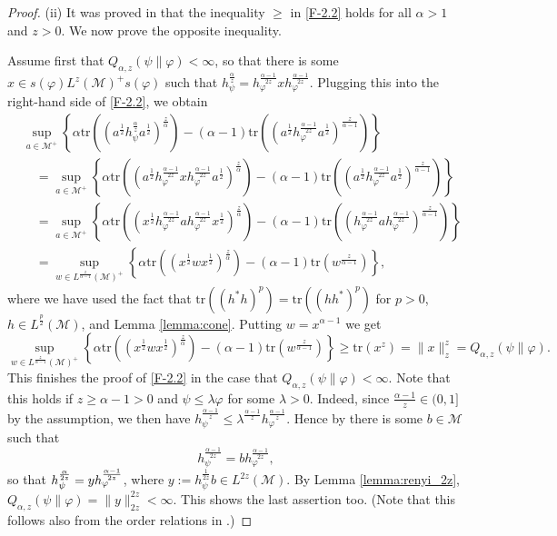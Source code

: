 \documentclass[12pt]{article}
\theoremstyle{definition}
\theoremstyle{remark}
\numberwithin{equation}{section}
\def\Me{\mathcal M}
\def\Tr{\mathrm{tr}}
\def\ffi{\varphi}
\begin{document}
\begin{proof}
\medskip
(ii)\enspace
It was proved in \cite[Theorem 2(vi)]{kato2023onrenyi} that the inequality $\ge$ in
\eqref{F-2.2} holds for all $\alpha>1$ and $z>0$. We now prove the opposite inequality. 

Assume first that $Q_{\alpha,z}(\psi\|\varphi)<\infty$, so that there is some $x\in
s(\varphi)L^z(\Me)^+s(\varphi)$ such that
$h_\psi^{\frac{\alpha}{z}}=h_\varphi^{\frac{\alpha-1}{2z}}xh_\varphi^{\frac{\alpha-1}{2z}}$. Plugging this
into the right-hand side of \eqref{F-2.2}, we obtain
\begin{align}
&\sup_{a\in \Me^+} \left\{\alpha
\Tr\left((a^{\frac12}h_\psi^{\frac{\alpha}{z}}a^{\frac12})^{\frac{z}{\alpha}}\right)-(\alpha-1)
\Tr\left((a^{\frac12}h_\varphi^{\frac{\alpha-1}{2z}}a^{\frac12})^{\frac{z}{\alpha-1}}\right) \right\}
\nonumber\\
&\quad=\sup_{a\in \Me^+} \left\{\alpha
\Tr\left((a^{\frac12}h_\varphi^{\frac{\alpha-1}{2z}}xh_\varphi^{\frac{\alpha-1}{2z}}
a^{\frac12})^{\frac{z}{\alpha}}\right)-(\alpha-1)
\Tr\left((a^{\frac12}h_\varphi^{\frac{\alpha-1}{2z}}a^{\frac12})^{\frac{z}{\alpha-1}}\right) \right\}
\nonumber\\
&\quad=\sup_{a\in \Me^+} \left\{\alpha
\Tr\left((x^{\frac12}h_\varphi^{\frac{\alpha-1}{2z}}ah_\varphi^{\frac{\alpha-1}{2z}}
x^{\frac12})^{\frac{z}{\alpha}}\right)-(\alpha-1)
\Tr\left((h_\varphi^{\frac{\alpha-1}{2z}}a h_\varphi^{\frac{\alpha-1}{2z}}
)^{\frac{z}{\alpha-1}}\right)\right\}\nonumber\\
&\quad=\sup_{w\in L^{\frac{z}{\alpha-1}}(\Me)^+} \left\{\alpha
\Tr\left((x^{\frac12}wx^{\frac12})^{\frac{z}{\alpha}}\right)-(\alpha-1)
\Tr\left(w^{\frac{z}{\alpha-1}}\right)
\right\}, \label{F-2.4}
\end{align}
where we have used the fact that $\Tr\left((h^*h)^p\right)=\Tr\left((hh^*)^p\right)$ for
$p>0$, $h\in L^{\frac{p}{2}}(\Me)$, and Lemma \ref{lemma:cone}.
Putting $w=x^{\alpha-1}$ we get
\[
\sup_{w\in L^{\frac{z}{\alpha-1}}(\Me)^+} \left\{\alpha
\Tr\left((x^{\frac12}wx^{\frac12})^{\frac{z}{\alpha}}\right)-(\alpha-1)
\Tr\left(w^{\frac{z}{\alpha-1}}\right)
\right\}\ge \Tr(x^z)=\|x\|_z^z= Q_{\alpha,z}(\psi\|\varphi).
\]
This finishes the proof of \eqref{F-2.2} in the case that $Q_{\alpha,z}(\psi\|\varphi)<\infty$. Note that
this holds if $z\ge \alpha-1>0$ and $\psi\le \lambda\varphi$ for some $\lambda>0$. Indeed, since
$\frac{\alpha-1}{z}\in (0,1]$ by the assumption, we then have 
$h_\psi^{\frac{\alpha-1}{z}}\le \lambda^{\frac{\alpha-1}{z}}h_\varphi^{\frac{\alpha-1}{z}}$.
Hence by \cite[Lemma A.58]{hiai2021quantum} there is some $b\in \Me$ such that 
\[
h_\psi^{\frac{\alpha-1}{2z}}=bh_\varphi^{\frac{\alpha-1}{2z}},
\]
so that $h_\psi^{\alpha\over2z}=yh_\ffi^{\alpha-1\over2z}$, where
 $y:=h_\psi^{\frac{1}{2z}}b\in L^{2z}(\Me)$. By Lemma \ref{lemma:renyi_2z},
$Q_{\alpha,z}(\psi\|\varphi)=\|y\|_{2z}^{2z}<\infty$. This shows the  last assertion too.
(Note that this follows also from the order relations in \cite[Theorem 2(iii)]{kato2023onrenyi}.)


\end{proof}
\end{document}
